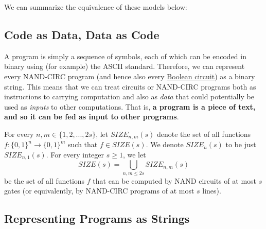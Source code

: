   We can summarize the equivalence of these models below: 

  \begin{center}
  \end{center}

\subsection{Code as Data, Data as Code}

  A program is simply a sequence of symbols, each of which can be encoded in binary using (for example) the ASCII standard. Therefore, we can represent every NAND-CIRC program (and hence also every \hyperref[def:boolean-circuit]{Boolean circuit}) as a binary string. This means that we can treat circuits or NAND-CIRC programs both as instructions to carrying computation and also as \textit{data} that could potentially be used as \textit{inputs} to other computations. That is, \textbf{a program is a piece of text, and so it can be fed as input to other programs}. 

  \begin{definition}
    \label{def:the-class-sizenms}
    For every $n, m \in \{1, 2, ..., 2s\}$, let $SIZE_{n, m} (s)$ denote the set of all functions $f: \{0,1\}^n \to \{0,1\}^m$ such that $f \in SIZE(s)$. We denote $SIZE_n (s)$ to be just $SIZE_{n,1} (s)$. For every integer $s \geq 1$, we let 
    \begin{equation}
      SIZE(s) = \bigcup_{n, m \leq 2s} SIZE_{n, m} (s)
    \end{equation}
    be the set of all functions $f$ that can be computed by NAND circuits of at most $s$ gates (or equivalently, by NAND-CIRC programs of at most $s$ lines). 
  \end{definition}

\subsection{Representing Programs as Strings}

